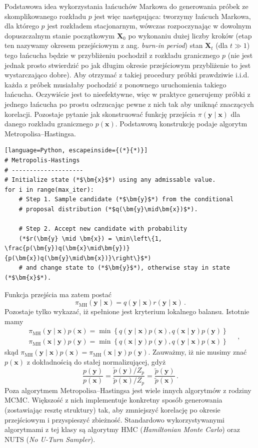 \documentclass{myclass}
\numberwithin{equation}{subsection}
\begin{document}
Podstawowa idea wykorzystania łańcuchów Markowa do generowania próbek ze skomplikowanego rozkładu
\(p\) jest więc następująca: tworzymy łańcuch Markowa, dla którego \(p\) jest rozkładem
stacjonarnym, wówczas rozpoczynając w dowolnym dopuszczalnym stanie początkowym \(\bm{X}_0\) po
wykonaniu dużej liczby kroków (etap ten nazywamy okresem przejściowym z ang. \textit{burn-in
period}) stan \(\bm{X}_t\) (dla \(t \gg 1\)) tego łańcucha będzie w przybliżeniu pochodził z
rozkładu granicznego \(p\) (nie jest jednak prosto stwierdzić po jak długim okresie przejściowym
przybliżenie to jest wystarczająco dobre). Aby otrzymać z takiej procedury próbki prawdziwie i.i.d.
każda z próbek musiałaby pochodzić z ponownego uruchomienia takiego łańcucha. Oczywiście jest to
nieefektywne, więc w praktyce generujemy próbki z jednego łańcucha po prostu odrzucając pewne z nich
tak aby uniknąć znaczących korelacji. Pozostaje pytanie jak skonstruować funkcję przejścia
\(\pi(\bm{y} \mid \bm{x})\) dla danego rozkładu granicznego \(p(\bm{x})\). Podstawową konstrukcję
podaje algorytm Metropolisa--Hastingsa.

\begin{lstlisting}[language=Python, escapeinside={(*}{*)}]
# Metropolis-Hastings
# --------------------
# Initialize state (*$\bm{x}$*) using any admissable value.
for i in range(max_iter):
    # Step 1. Sample candidate (*$\bm{y}$*) from the conditional 
    # proposal distribution (*$q(\bm{y}\mid\bm{x})$*).
    
    # Step 2. Accept new candidate with probability
    (*$r(\bm{y} \mid \bm{x}) = \min\left\{1, \frac{p(\bm{y})q(\bm{x}\mid\bm{y})}{p(\bm{x})q(\bm{y}\mid\bm{x})}\right\}$*)
    # and change state to (*$\bm{y}$*), otherwise stay in state (*$\bm{x}$*). 
\end{lstlisting}
Funkcja przejścia ma zatem postać
\[
\pi_\text{MH}(\bm{y}\mid\bm{x}) = q(\bm{y} \mid \bm{x}) r(\bm{y} \mid \bm{x})\,.
\]
Pozostaje tylko wykazać, iż spełnione jest kryterium lokalnego balansu. Istotnie mamy
\[
\begin{split}
&\pi_\text{MH}(\bm{y}\mid\bm{x})p(\bm{x}) = \min\left\{q(\bm{y}\mid\bm{x})p(\bm{x}), q(\bm{x}\mid\bm{y})p(\bm{y})\right\}\\
&\pi_\text{MH}(\bm{x}\mid\bm{y})p(\bm{y}) = \min\left\{q(\bm{x}\mid\bm{y})p(\bm{y}), q(\bm{y}\mid\bm{x})p(\bm{x})\right\}
\end{split}\quad,
\]
skąd \(\pi_\text{MH}(\bm{y}\mid\bm{x})p(\bm{x}) = \pi_\text{MH}(\bm{x}\mid\bm{y})p(\bm{y})\).
Zauważmy, iż nie musimy znać \(p(\bm{x})\) z dokładnością do stałej normalizującej, gdyż
\[
\frac{p(\bm{y})}{p(\bm{x})} = \frac{\tilde{p}(\bm{y})/Z_p}{\tilde{p}(\bm{x})/Z_p} = \frac{\tilde{p}(\bm{y})}{\tilde{p}(\bm{x})}\,.
\]
Poza algorytmem Metropolisa--Hastingsa jest wiele innych algorytmów z rodziny MCMC. Większość z nich
implementuje konkretny sposób generowania (zostawiając resztę struktury) tak, aby zmniejszyć
korelację po okresie przejściowym i przyspieszyć zbieżność. Standardowo wykorzystywanymi algorytmami
z tej klasy są algorytmy HMC (\textit{Hamiltonian Monte Carlo}) oraz NUTS (\textit{No U-Turn
Sampler}).
\end{document}
